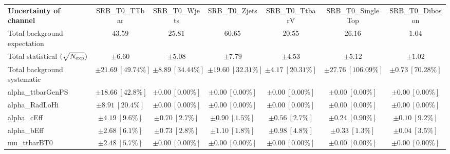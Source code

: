 
\begin{sidewaystable}
\begin{center}
\setlength{\tabcolsep}{0.0pc}
\begin{tabular*}{\textwidth}{@{\extracolsep{\fill}}lcccccc}
\noalign{\smallskip}\hline\noalign{\smallskip}
{\bf Uncertainty of channel}                                    & SRB\_T0\_TTbar            & SRB\_T0\_Wjets            & SRB\_T0\_Zjets            & SRB\_T0\_TtbarV            & SRB\_T0\_SingleTop            & SRB\_T0\_Diboson            \\
\noalign{\smallskip}\hline\noalign{\smallskip}
Total background expectation             &  $43.59$        &  $25.81$        &  $60.65$        &  $20.55$        &  $26.16$        &  $1.04$       \\
\noalign{\smallskip}\hline\noalign{\smallskip}
Total statistical $(\sqrt{N_{\rm exp}})$              & $\pm 6.60$        & $\pm 5.08$        & $\pm 7.79$        & $\pm 4.53$        & $\pm 5.12$        & $\pm 1.02$       \\
Total background systematic               & $\pm 21.69\ [49.74\%] $        & $\pm 8.89\ [34.44\%] $        & $\pm 19.60\ [32.31\%] $        & $\pm 4.17\ [20.31\%] $        & $\pm 27.76\ [106.09\%] $        & $\pm 0.73\ [70.28\%] $             \\
\noalign{\smallskip}\hline\noalign{\smallskip}
\noalign{\smallskip}\hline\noalign{\smallskip}
alpha\_ttbarGenPS         & $\pm 18.66\ [42.8\%] $          & $\pm 0.00\ [0.00\%] $          & $\pm 0.00\ [0.00\%] $          & $\pm 0.00\ [0.00\%] $          & $\pm 0.00\ [0.00\%] $          & $\pm 0.00\ [0.00\%] $       \\
alpha\_RadLoHi         & $\pm 8.91\ [20.4\%] $          & $\pm 0.00\ [0.00\%] $          & $\pm 0.00\ [0.00\%] $          & $\pm 0.00\ [0.00\%] $          & $\pm 0.00\ [0.00\%] $          & $\pm 0.00\ [0.00\%] $       \\
alpha\_cEff         & $\pm 4.19\ [9.6\%] $          & $\pm 0.70\ [2.7\%] $          & $\pm 0.90\ [1.5\%] $          & $\pm 0.56\ [2.7\%] $          & $\pm 0.24\ [0.90\%] $          & $\pm 0.10\ [9.2\%] $       \\
alpha\_bEff         & $\pm 2.68\ [6.1\%] $          & $\pm 0.73\ [2.8\%] $          & $\pm 1.10\ [1.8\%] $          & $\pm 0.98\ [4.8\%] $          & $\pm 0.33\ [1.3\%] $          & $\pm 0.04\ [3.5\%] $       \\
mu\_ttbarBT0         & $\pm 2.48\ [5.7\%] $          & $\pm 0.00\ [0.00\%] $          & $\pm 0.00\ [0.00\%] $          & $\pm 0.00\ [0.00\%] $          & $\pm 0.00\ [0.00\%] $          & $\pm 0.00\ [0.00\%] $       \\

\end{tabular*}
\end{center}
\end{sidewaystable}
